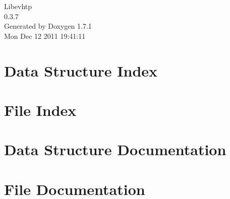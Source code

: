 \documentclass[a4paper]{book}
\begin{document}
\hypersetup{pageanchor=false}
\begin{titlepage}
\vspace*{7cm}
\begin{center}
{\Large Libevhtp \\[1ex]\large 0.3.7 }\\
\vspace*{1cm}
{\large Generated by Doxygen 1.7.1}\\
\vspace*{0.5cm}
{\small Mon Dec 12 2011 19:41:11}\\
\end{center}
\end{titlepage}
\clearemptydoublepage
{}
\tableofcontents
\clearemptydoublepage
{}
\hypersetup{pageanchor=true}
\chapter{Data Structure Index}

\chapter{File Index}

\chapter{Data Structure Documentation}













\chapter{File Documentation}


\printindex
\end{document}
